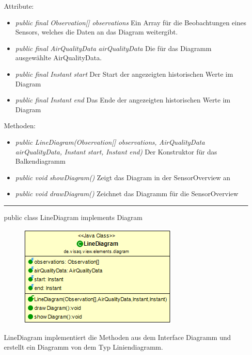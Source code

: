 Attribute:
\begin{itemize}
    \item \emph{public final Observation[] observations} Ein Array für die Beobachtungen eines Sensors, welches die Daten an das Diagram weitergibt.
    \item \emph{public final AirQualityData airQualityData} Die für das Diagramm ausgewählte AirQualityData.
    \item \emph{public final Instant start} Der Start der angezeigten historischen Werte im Diagram
    \item \emph{public final Instant end} Das Ende der angezeigten historischen Werte im Diagram
\end{itemize}
Methoden:
\begin{itemize}
    \item \emph{public LineDiagram(Observation[] observations, AirQualityData airQualityData, Instant start, Instant end)} Der Konstruktor für das Balkendiagramm
    \item \emph{public void showDiagram()} Zeigt das Diagram in der SensorOverview an
    \item \emph{public void drawDiagram()} Zeichnet das Diagramm für die SensorOverview
\end{itemize}

\rule{\textwidth}{0.4pt}
public class LineDiagram implements Diagram

\begin{minipage}{0.3\textwidth}
    \begin{figure}[H]
        \includegraphics[scale = 0.5]{media/frontend/view/de.view.elements.diagram/LineDiagram_Class.png}
    \end{figure}
    \end{minipage} \hfill
    \begin{minipage}{0.6\textwidth}
LineDiagram implementiert die Methoden aus dem Interface Diagramm und erstellt ein Diagramm von dem Typ Liniendiagramm.
\end{minipage}

